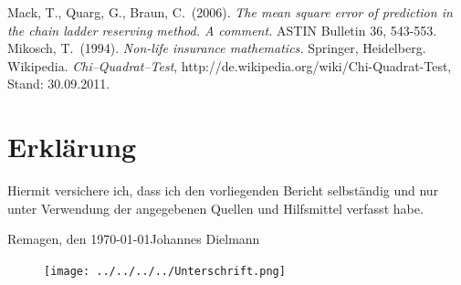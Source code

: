 \documentclass[11pt]{article}
\begin{document}
\begin{thebibliography}{99}
 Mack, T., Quarg, G., Braun, C.\ (2006). {\em The mean square error of prediction in the chain ladder reserving method. A comment.} ASTIN Bulletin 36, 543-553. 
 Mikosch, T.\ (1994). {\em Non-life insurance mathematics.} Springer, Heidelberg.
 Wikipedia. {\em Chi--Quadrat--Test}, http://de.wikipedia.org/wiki/Chi-Quadrat-Test, Stand: 30.09.2011.
\end{thebibliography}
\newpage

\section*{Erklärung}

\vspace{2cm}

Hiermit versichere ich, dass ich den vorliegenden Bericht selbständig und nur unter Verwendung der angegebenen Quellen und Hilfsmittel verfasst habe.

\vspace{2cm}

Remagen, den \today \hfill {Johannes Dielmann} 
\begin{figure}[hp]
	\hfill
	\texttt{[image: ../../../../Unterschrift.png]}
\end{figure}
\end{document}
